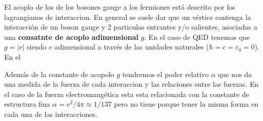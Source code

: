 El acoplo de los de los bosones gauge a los fermiones está descrito por los lagrangianos de interaccion. En general se suele dar que un vértice contenga la interacción de un boson gauge y 2 particulas entrantes y/o salientes, asociadas a una \textbf{consatnte de acoplo adimensional} $g$. En el caso de QED tenemos que $g=|e|$ siendo $e$ adimensional a través de las unidades naturales ($\hbar = c = \varepsilon_0 =0$). En el

Además de la constante de acopolo $g$ tendremos el poder relativo $\alpha$ que nos da una medida de la fuerza de cada interaccion y las relaciones entre las fuerzas. En el caso de la fuerza electromangética esta esta relacionada con la constante de estructura fina $\alpha= e^2 / 4 \pi \approx 1/137$ pero no tiene porque tener la misma forma en cada una de las interacciones.

